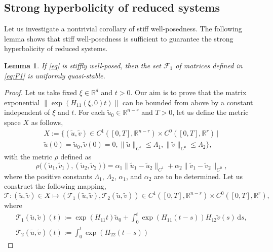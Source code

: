 \documentclass{article}
\theoremstyle{plain}%
\newtheorem{lemma}{Lemma}%
\theoremstyle{definition}%
\theoremstyle{remark}%
\newcommand{\bR}{\mathbb{R}}
\newcommand{\cF}{\mathcal{F}}
\newcommand{\cT}{\mathcal{T}}
\newcommand{\rd}{\mathrm{d}}
\newcommand{\+}[1]{{\bm{#1}}}
\begin{document}
\subsection{Strong hyperbolicity of reduced systems}
Let us investigate a nontrivial corollary of stiff 
well-posedness. 
The following lemma shows that stiff well-posedness is sufficient 
to guarantee the strong hyperbolicity of reduced systems. 

\begin{lemma}\label{lemma:UQS_of_F1}
  If \cref{eq} is stiffly well-posed, then the set $\cF_1$ 
  of matrices defined in \cref{eq:F1} is uniformly quasi-stable.
\end{lemma}

\begin{proof}
  Let us take fixed $\xi \in \bR^d$ and $t > 0$. Our aim is to  
  prove that the matrix exponential $\|\exp(H_{11}(\xi, 0) t)\|$ can 
  be bounded from above by a constant independent of $\xi$ and $t$.
  For each $\tilde{u}_0 \in \bR^{n - r}$ and $T > 0$,
  let us define the metric space $X$ as follows, 
  \begin{multline*}
    X := \Big\{ (\tilde{u}, \tilde{v}) \in C^1([0, T], \bR^{n - r}) 
    \times C^0([0, T], \bR^r) \,\Big|\, \\
    \tilde{u}(0) = \tilde{u}_0, \tilde{v}(0) = 0,
    \|\tilde{u}\|_{C^1} \le \Lambda_1, 
    \|\tilde{v}\|_{C^0} \le \Lambda_2 \Big\},
  \end{multline*}
  with the metric $\rho$ defined as 
  \begin{displaymath}
    \rho \big( (\tilde{u}_1, \tilde{v}_1), (\tilde{u}_2, \tilde{v}_2) 
    \big) = \alpha_1 
    \|\tilde{u}_1 - \tilde{u}_2\|_{C^1} + 
    \alpha_2 \|\tilde{v}_1 - \tilde{v}_2\|_{C^0},
  \end{displaymath}
  where the positive constants $\Lambda_1$, $\Lambda_2$, $\alpha_1$, 
  and $\alpha_2$ are to be determined.
  Let us construct the following mapping, 
  \begin{displaymath}
    \cT : (\tilde{u}, \tilde{v}) \in X \mapsto 
    (\cT_1(\tilde{u}, \tilde{v}), \cT_2(\tilde{u}, \tilde{v})) \in 
    C^1([0, T], \bR^{n - r}) \times C^0([0, T], \bR^r),
  \end{displaymath}
  where 
  \begin{gather*}
    \cT_1(\tilde{u}, \tilde{v})(t) := \exp(H_{11} t) \tilde{u}_0 + 
    \int_0^t \exp(H_{11} (t - s)) H_{12} \tilde{v}(s) \,\rd s, \\
    \cT_2(\tilde{u}, \tilde{v})(t) := \int_0^t \exp(H_{22} (t - s)) 

\end{gather*}
\end{proof}
\end{document}
